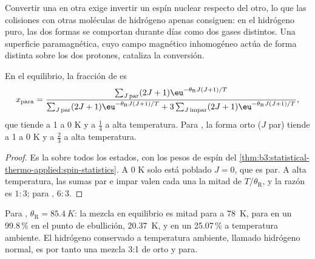 Convertir una en otra exige invertir un espín nuclear respecto del
otro, lo que las colisiones con otras moléculas de hidrógeno apenas consiguen: en el hidrógeno
puro, las dos formas se comportan durante días como dos gases distintos. Una superficie
paramagnética, cuyo campo magnético inhomogéneo actúa de forma distinta sobre los dos
protones, cataliza la conversión.

\begin{proposition}\label{prop:b3:statistical-thermo-applied:ortho-para}
En el equilibrio, la fracción de  es
\[
  x_{\mathrm{para}} = \frac{\sum_{J\,\mathrm{par}}(2J+1)\eu^{-\theta_{\mathrm R}J(J+1)/T}}
    {\sum_{J\,\mathrm{par}}(2J+1)\eu^{-\theta_{\mathrm R}J(J+1)/T} + 3\sum_{J\,\mathrm{impar}}(2J+1)\eu^{-\theta_{\mathrm R}J(J+1)/T}},
\]
que tiende a 1 a 0 K y a $\frac14$ a alta temperatura. Para , la forma orto
($J$ par) tiende a 1 a 0 K y a $\frac23$ a alta temperatura.
\end{proposition}

\begin{proof}
Es la  sobre todos los estados, con los pesos de espín del
\cref{thm:b3:statistical-thermo-applied:spin-statistics}. A 0 K solo está poblado $J = 0$, que es
par. A alta temperatura, las sumas par e impar valen cada una la mitad
de $T/\theta_{\mathrm R}$, y la razón es $1 : 3$; para , $6 : 3$.
\end{proof}

Para , $\theta_{\mathrm R} = \qty{85.4}{K}$: la mezcla en equilibrio es mitad para a \qty{78}{K},
para en un 99.8\,\% en el punto de ebullición, \qty{20.37}{K}, y en un 25.07\,\% a temperatura
ambiente. El hidrógeno conservado a temperatura ambiente, llamado hidrógeno normal, es
por tanto una mezcla 3:1 de orto y para.

